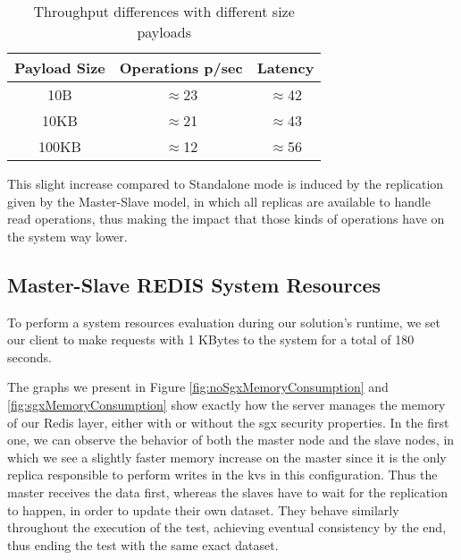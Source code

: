 \begin{table}[ht]
	\caption{Throughput differences with different size payloads} %
	\centering %
	\begin{tabular}{c c c} %
		\hline\hline %
		\textbf{Payload Size} & \textbf{Operations p/sec} & \textbf{Latency}\\ [0.5ex] %
		\hline
		10B & $\approx$23 & $\approx$42\\
		\hline
		10KB & $\approx$21 & $\approx$43\\
		\hline %
		100KB & $\approx$12 & $\approx$56\\ [1ex] %
		\hline %
	\end{tabular}
	\label{table:throughputPayloadsMS} %
\end{table} 

This slight increase compared to Standalone mode is induced by the replication given by the Master-Slave model, in which all replicas are available to handle read operations, thus making the impact that those kinds of operations have on the system way lower.   


\subsection{Master-Slave REDIS System Resources}
\label{ssec:MSRedis_MemCPU}

To perform a system resources evaluation during our solution's runtime, we set our client to make requests with 1 KBytes to the system for a total of 180 seconds.  

The graphs we present in Figure \ref{fig:noSgxMemoryConsumption} and \ref{fig:sgxMemoryConsumption} show exactly how the server manages the memory of our Redis layer, either with or without the \gls{sgx} security properties. 
In the first one, we can observe the behavior of both the master node and the slave nodes, in which we see a slightly faster memory increase on the master since it is the only replica responsible to perform writes in the \gls{kvs} in this configuration. Thus the master receives the data first, whereas the slaves have to wait for the replication to happen, in order to update their own dataset. 
They behave similarly throughout the execution of the test, achieving eventual consistency by the end, thus ending the test with the same exact dataset. 

